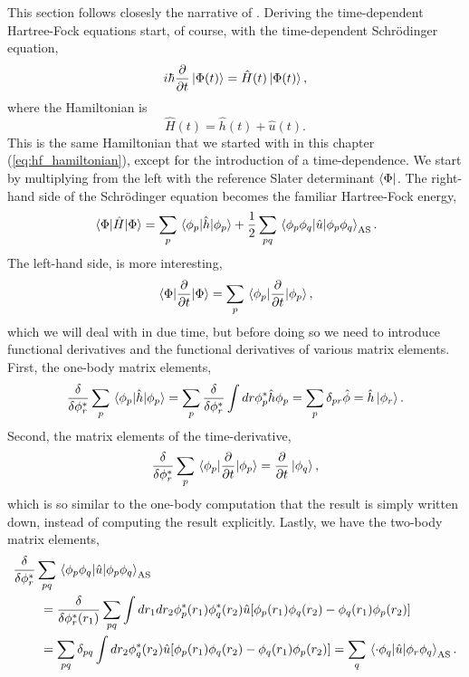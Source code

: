 This section follows closesly the narrative of \citeauthor{hochstuhl2014time}\cite{hochstuhl2014time}.
Deriving the time-dependent Hartree-Fock equations start,
of course, with the time-dependent Schrödinger equation,
\begin{equation}
    i\hbar \frac{\partial}{\partial t}\ket{\Phi(t)} = \hat{H}(t)\ket{\Phi(t)},
\end{equation}
where the Hamiltonian is 
\begin{equation}
    \hat{H}(t) = \hat{h}(t) + \hat{u}(t).
\end{equation}
This is the same Hamiltonian that we started with in this chapter (\autoref{eq:hf_hamiltonian}),
except for the introduction of a 
time-dependence. We start by multiplying from the left with the reference Slater
determinant $\bra{\Phi}$. The right-hand side of the Schrödinger equation becomes
the familiar Hartree-Fock energy,
\begin{equation}
    \mel{\Phi}{\hat{H}}{\Phi} 
    = \sum_p \mel{\phi_p}{\hat{h}}{\phi_p}
    + \frac{1}{2} \sum_{pq}\mel{\phi_p\phi_q}{\hat{u}}{\phi_p\phi_q}_\text{AS}.
\end{equation}
The left-hand side, is more interesting,
\begin{equation}
    \mel{\Phi}{\frac{\partial}{\partial t}}{\Phi} 
    = \sum_p \mel{\phi_p}{\frac{\partial}{\partial t}}{\phi_p},
\end{equation}
which we will deal with in due time, but before doing so we need to introduce 
functional derivatives and the functional derivatives of various matrix elements.
First, the one-body matrix elements,
\begin{equation}
        \frac{\delta}{\delta\phi^*_r} \sum_p \mel{\phi_p}{\hat{h}}{\phi_p}
        = \sum_p \frac{\delta}{\delta \phi^*_r}
            \int dr \phi_p^* \hat{h} \phi_p 
        = \sum_p \delta_{pr} \hat{\phi} = \hat{h}\ket{\phi_r}.
\end{equation}
Second, the matrix elements of the time-derivative,
\begin{equation}
    \frac{\delta}{\delta \phi_r^*} \sum_p\mel{\phi_p}{\frac{\partial}{\partial t}}{\phi_p}
    = \frac{\partial}{\partial t} \ket{\phi_q},
\end{equation}
which is so similar to the one-body computation that the result is simply written down,
instead of computing the result explicitly.
Lastly, we have the two-body matrix elements,
\begin{equation}
    \begin{aligned}
        \frac{\delta}{\delta \phi_r^*} &\sum_{pq}
            \mel{\phi_p\phi_q}{\hat{u}}{\phi_p\phi_q}_\text{AS} \\
        &\ = \frac{\delta}{\delta \phi_r^*(r_1)} \sum_{pq} \int dr_1 dr_2 
            \phi_p^*(r_1) \phi_q^*(r_2)\hat{u}[\phi_p(r_1)\phi_q(r_2) - \phi_q(r_1)\phi_p(r_2)] \\
        &\ = \sum_{pq}\delta_{pq} \int dr_2 \phi_q^*(r_2) 
            \hat{u} [\phi_p(r_1) \phi_q(r_2) - \phi_q(r_1)\phi_p(r_2)]
        = \sum_q \mel{\cdot \phi_q}{\hat{u}}{\phi_r\phi_q}_\text{AS}.
    \end{aligned}
\end{equation}

